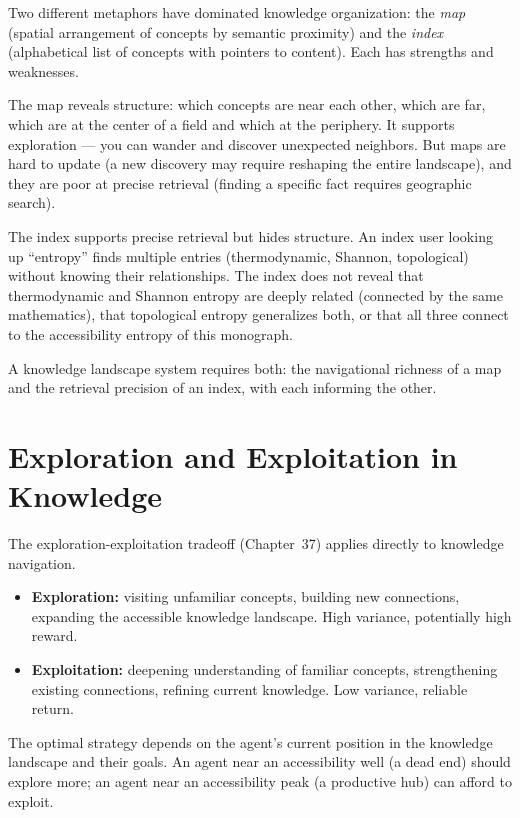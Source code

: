 Two different metaphors have dominated knowledge organization: the
\emph{map} (spatial arrangement of concepts by semantic proximity)
and the \emph{index} (alphabetical list of concepts with pointers to
content). Each has strengths and weaknesses.

The map reveals structure: which concepts are near each other, which
are far, which are at the center of a field and which at the periphery.
It supports exploration — you can wander and discover unexpected
neighbors. But maps are hard to update (a new discovery may require
reshaping the entire landscape), and they are poor at precise retrieval
(finding a specific fact requires geographic search).

The index supports precise retrieval but hides structure. An index
user looking up ``entropy'' finds multiple entries (thermodynamic,
Shannon, topological) without knowing their relationships. The index
does not reveal that thermodynamic and Shannon entropy are deeply related
(connected by the same mathematics), that topological entropy generalizes
both, or that all three connect to the accessibility entropy of this
monograph.

A knowledge landscape system requires both: the navigational richness
of a map and the retrieval precision of an index, with each informing
the other.

\section{Exploration and Exploitation in Knowledge}

The exploration-exploitation tradeoff (Chapter~37) applies directly
to knowledge navigation.

\begin{itemize}
  \item \textbf{Exploration:} visiting unfamiliar concepts, building
        new connections, expanding the accessible knowledge landscape.
        High variance, potentially high reward.
  \item \textbf{Exploitation:} deepening understanding of familiar
        concepts, strengthening existing connections, refining current
        knowledge. Low variance, reliable return.
\end{itemize}

The optimal strategy depends on the agent's current position in the
knowledge landscape and their goals. An agent near an accessibility
well (a dead end) should explore more; an agent near an accessibility
peak (a productive hub) can afford to exploit.

